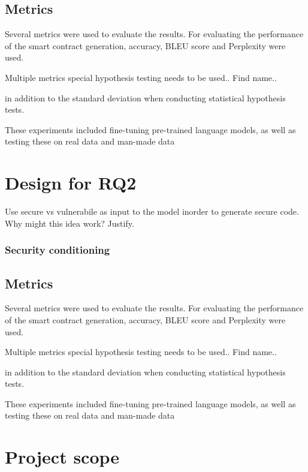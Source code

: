 \subsection{Metrics}

Several metrics were used to evaluate the results. For evaluating the performance of the smart contract generation, accuracy, BLEU score and Perplexity were used. 

Multiple metrics special hypothesis testing needs to be used.. Find name..

in addition to the standard deviation when conducting statistical hypothesis tests.

These experiments included fine-tuning pre-trained language models, as well as testing these on real data and man-made data




\section{Design for RQ2}
\label{sec:design-for-rq2}
Use secure vs vulnerabile as input to the  model inorder to generate secure code. 
Why might this idea work? Justify.

\subsubsection{Security conditioning}

\subsection{Metrics}

Several metrics were used to evaluate the results. For evaluating the performance of the smart contract generation, accuracy, BLEU score and Perplexity were used. 

Multiple metrics special hypothesis testing needs to be used.. Find name..

in addition to the standard deviation when conducting statistical hypothesis tests.

These experiments included fine-tuning pre-trained language models, as well as testing these on real data and man-made data


\section{Project scope}
\label{sec:project-scope}

